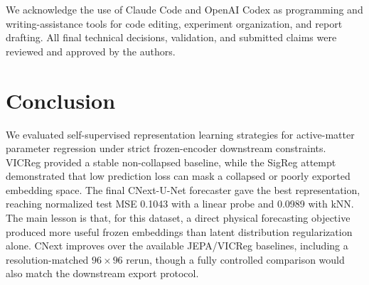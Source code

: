 \documentclass{article}
\begin{document}
We acknowledge the use of Claude Code and OpenAI Codex as programming and writing-assistance tools for code editing, experiment organization, and report drafting. All final technical decisions, validation, and submitted claims were reviewed and approved by the authors.

\section{Conclusion}

We evaluated self-supervised representation learning strategies for active-matter parameter regression under strict frozen-encoder downstream constraints. VICReg provided a stable non-collapsed baseline, while the SigReg attempt demonstrated that low prediction loss can mask a collapsed or poorly exported embedding space. The final CNext-U-Net forecaster gave the best representation, reaching normalized test MSE 0.1043 with a linear probe and 0.0989 with kNN. The main lesson is that, for this dataset, a direct physical forecasting objective produced more useful frozen embeddings than latent distribution regularization alone. CNext improves over the available JEPA/VICReg baselines, including a resolution-matched $96\times96$ rerun, though a fully controlled comparison would also match the downstream export protocol.



\end{document}
